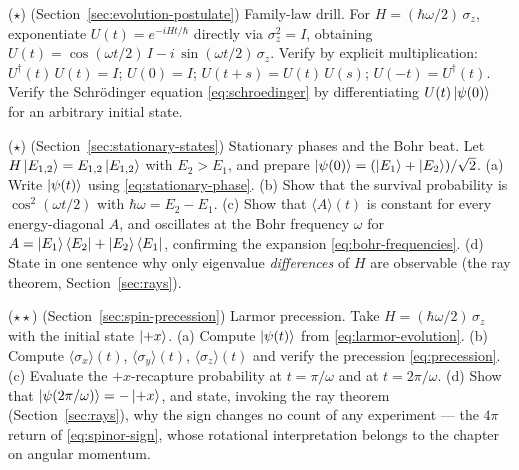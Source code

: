 \begin{problemset}
\item ($\star$) (Section~\ref{sec:evolution-postulate}) Family-law drill. For $H = (\hbar\omega/2)\,\sigma_z$, exponentiate $U(t) = e^{-iHt/\hbar}$ directly via $\sigma_z^2 = I$, obtaining $U(t) = \cos(\omega t/2)\,I - i\,\sin(\omega t/2)\,\sigma_z$. Verify by explicit multiplication: $U^\dagger(t)\,U(t) = I$; $U(0) = I$; $U(t+s) = U(t)\,U(s)$; $U(-t) = U^\dagger(t)$. Verify the Schr\"odinger equation \eqref{eq:schroedinger} by differentiating $U(t)\ket{\psi(0)}$ for an arbitrary initial state.

\item ($\star$) (Section~\ref{sec:stationary-states}) Stationary phases and the Bohr beat. Let $H\ket{E_{1,2}} = E_{1,2}\ket{E_{1,2}}$ with $E_2 > E_1$, and prepare $\ket{\psi(0)} = (\ket{E_1} + \ket{E_2})/\sqrt{2}$. (a) Write $\ket{\psi(t)}$ using \eqref{eq:stationary-phase}. (b) Show that the survival probability is $\cos^2(\omega t/2)$ with $\hbar\omega = E_2 - E_1$. (c) Show that $\langle A\rangle(t)$ is constant for every energy-diagonal $A$, and oscillates at the Bohr frequency $\omega$ for $A = \ket{E_1}\bra{E_2} + \ket{E_2}\bra{E_1}$, confirming the expansion \eqref{eq:bohr-frequencies}. (d) State in one sentence why only eigenvalue \emph{differences} of $H$ are observable (the ray theorem, Section~\ref{sec:rays}).

\item ($\star\star$) (Section~\ref{sec:spin-precession}) Larmor precession. Take $H = (\hbar\omega/2)\,\sigma_z$ with the initial state $\ket{+x}$. (a) Compute $\ket{\psi(t)}$ from \eqref{eq:larmor-evolution}. (b) Compute $\langle\sigma_x\rangle(t)$, $\langle\sigma_y\rangle(t)$, $\langle\sigma_z\rangle(t)$ and verify the precession \eqref{eq:precession}. (c) Evaluate the $+x$-recapture probability at $t = \pi/\omega$ and at $t = 2\pi/\omega$. (d) Show that $\ket{\psi(2\pi/\omega)} = -\ket{+x}$, and state, invoking the ray theorem (Section~\ref{sec:rays}), why the sign changes no count of any experiment --- the $4\pi$ return of \eqref{eq:spinor-sign}, whose rotational interpretation belongs to the chapter on angular momentum.


\end{problemset}

